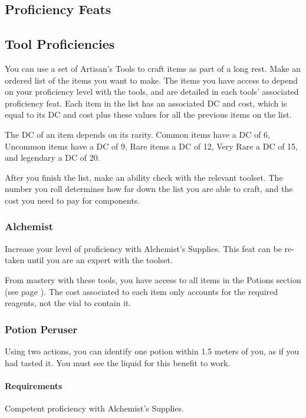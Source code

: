 \subsection*{Proficiency Feats}

\subsection*{Tool Proficiencies}
You can use a set of Artisan's Tools to craft items as part of a long rest.
Make an ordered list of the items you want to make.
The items you have access to depend on your proficiency level with the tools, and are detailed in each tools' associated proficiency feat.
Each item in the list has an associated DC and cost, which is equal to its DC and cost plus these values for all the previous items on the list.

The DC of an item depends on its rarity.
Common items have a DC of 6, Uncommon items have a DC of 9, Rare items a DC of 12, Very Rare a DC of 15, and legendary a DC of 20.

After you finish the list, make an ability check with the relevant toolset.
The number you roll determines how far down the list you are able to craft, and the cost you need to pay for components.

\subsubsection{Alchemist} \label{feat::alchemist}
    Increase your level of proficiency with Alchemist's Supplies.
    This feat can be re-taken until you are an expert with the toolset.

    From mastery with these tools, you have access to all items in the Potions section (see page \pageref{ssec::potions}).
    The cost associated to each item only accounts for the required reagents, not the vial to contain it.
\subsubsection{Potion Peruser} \label{feat::potionperuser}
    Using two actions, you can identify one potion within 1.5 meters of you, as if you had tasted it.
    You must see the liquid for this benefit to work.
    \paragraph{Requirements} Competent proficiency with Alchemist's Supplies.
